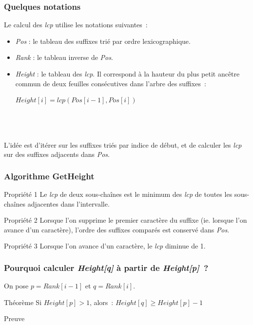 \documentclass[10pt]{beamer}
\begin{document}
\begin{frame}
  \frametitle{Quelques notations}

  Le calcul des \textit{lcp} utilise les notations suivantes~:
  \begin{itemize}
  \item \textit{Pos} : le tableau des suffixes trié par ordre lexicographique.
  \item \textit{Rank} : le tableau inverse de \textit{Pos}.
  \item \textit{Height} : le tableau des \textit{lcp}. Il correspond à la
    hauteur du plus petit ancêtre commun de deux feuilles consécutives dans
    l'arbre des suffixes~:
    \begin{center}
    $\mathit{Height}[i] = \mathit{lcp}(\mathit{Pos}[i-1], \mathit{Pos}[i])$
    \end{center}
  \end{itemize}
  \hfill \\ \hfill \\ \hfill \\

  L'idée est d'itérer sur les suffixes triés par indice de début, et de
  calculer les \textit{lcp} sur des suffixes adjacents dans \textit{Pos}.
\end{frame}

\begin{frame}
  \frametitle{Algorithme GetHeight}

  \begin{block}{Propriété 1}
  Le \textit{lcp} de deux sous-chaînes est le minimum des \textit{lcp} de
  toutes les sous-chaînes adjacentes dans l'intervalle.
  \end{block}
  \begin{block}{Propriété 2}
  Lorsque l'on supprime le premier caractère du suffixe (ie. lorsque l'on
  avance d'un caractère), l'ordre des suffixes comparés est conservé dans
  \textit{Pos}.
  \end{block}
  \begin{block}{Propriété 3}
  Lorsque l'on avance d'un caractère, le \textit{lcp} diminue de 1.
  \end{block}
\end{frame}

\begin{frame}
  \frametitle{Pourquoi calculer \textit{Height[q]} à partir de
    \textit{Height[p]}~?}

  On pose $p = \mathit{Rank}[i-1]$ et $q = \mathit{Rank}[i]$.
  \begin{block}{Théorème}
  Si $\mathit{Height}[p] > 1$, alors~:
  $\mathit{Height}[q] ≥ \mathit{Height}[p] - 1$
  \end{block}
  \begin{block}{Preuve}

  \end{block}
\end{frame}
\end{document}
